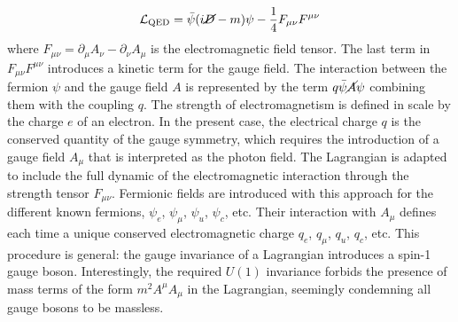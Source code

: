 \begin{equation}\label{eq-QEDLag}
    \mathcal{L}_{\text{QED}} = \bar{\psi} (i \cancel{D}- m) \psi - \frac{1}{4} F_{\mu\nu} F^{\mu\nu}
\end{equation}
where $F_{\mu\nu} = \partial_{\mu} A_\nu - \partial_\nu A_{\mu} $ is the electromagnetic field tensor. The last term in $F_{\mu\nu} F^{\mu\nu}$ introduces a kinetic term for the gauge field. The interaction between the fermion $\psi$ and the gauge field $A$ is represented by the term $q \bar{\psi} \cancel{A} \psi$ combining them with the coupling $q$. The strength of electromagnetism is defined in scale by the charge $e$ of an electron. In the present case, the electrical charge $q$ is the conserved quantity of the gauge symmetry, which requires the introduction of a gauge field $A_\mu$ that is interpreted as the photon field. The Lagrangian is adapted to include the full dynamic of the electromagnetic interaction through the strength tensor $F_{\mu\nu}$. Fermionic fields are introduced with this approach for the different known fermions, $\psi_e$, $\psi_{\mu}$, $\psi_u$, $\psi_c$, etc. Their interaction with $A_\mu$ defines each time a unique conserved electromagnetic charge $q_e$, $q_{\mu}$, $q_u$, $q_c$, etc. This procedure is general: the gauge invariance of a Lagrangian introduces a spin-1 gauge boson. Interestingly, the required $U(1)$ invariance forbids the presence of mass terms of the form $m^2 A^{\mu} A_{\mu}$ in the Lagrangian, seemingly condemning all gauge bosons to be massless. 

